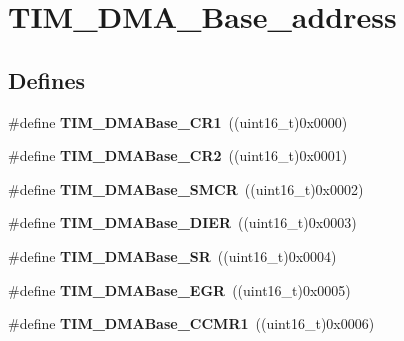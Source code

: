 \hypertarget{group__TIM__DMA__Base__address}{
\section{TIM\_\-DMA\_\-Base\_\-address}
\label{group__TIM__DMA__Base__address}
}
\subsection*{Defines}
\begin{DoxyCompactItemize}
\item 
\hypertarget{group__TIM__DMA__Base__address_ga73bca5b14da2d5026fa3877d0db53740}{
\#define {\bfseries TIM\_\-DMABase\_\-CR1}~((uint16\_\-t)0x0000)}
\label{group__TIM__DMA__Base__address_ga73bca5b14da2d5026fa3877d0db53740}

\item 
\hypertarget{group__TIM__DMA__Base__address_ga50e894f0d2cecc1ff3a3578098c3246e}{
\#define {\bfseries TIM\_\-DMABase\_\-CR2}~((uint16\_\-t)0x0001)}
\label{group__TIM__DMA__Base__address_ga50e894f0d2cecc1ff3a3578098c3246e}

\item 
\hypertarget{group__TIM__DMA__Base__address_ga748e24ac0675caa55869d6ba506448df}{
\#define {\bfseries TIM\_\-DMABase\_\-SMCR}~((uint16\_\-t)0x0002)}
\label{group__TIM__DMA__Base__address_ga748e24ac0675caa55869d6ba506448df}

\item 
\hypertarget{group__TIM__DMA__Base__address_gaeddacbbc2adf9705feac250f077d8c93}{
\#define {\bfseries TIM\_\-DMABase\_\-DIER}~((uint16\_\-t)0x0003)}
\label{group__TIM__DMA__Base__address_gaeddacbbc2adf9705feac250f077d8c93}

\item 
\hypertarget{group__TIM__DMA__Base__address_ga5cda07a11a76bbb24a7d5bb680814d31}{
\#define {\bfseries TIM\_\-DMABase\_\-SR}~((uint16\_\-t)0x0004)}
\label{group__TIM__DMA__Base__address_ga5cda07a11a76bbb24a7d5bb680814d31}

\item 
\hypertarget{group__TIM__DMA__Base__address_gab5e6f6c3fea100896d13ce317a6ccd8e}{
\#define {\bfseries TIM\_\-DMABase\_\-EGR}~((uint16\_\-t)0x0005)}
\label{group__TIM__DMA__Base__address_gab5e6f6c3fea100896d13ce317a6ccd8e}

\item 
\hypertarget{group__TIM__DMA__Base__address_gaab384496cff3e54d8179fc0db727c7ee}{
\#define {\bfseries TIM\_\-DMABase\_\-CCMR1}~((uint16\_\-t)0x0006)}
\label{group__TIM__DMA__Base__address_gaab384496cff3e54d8179fc0db727c7ee}


\end{DoxyCompactItemize}
